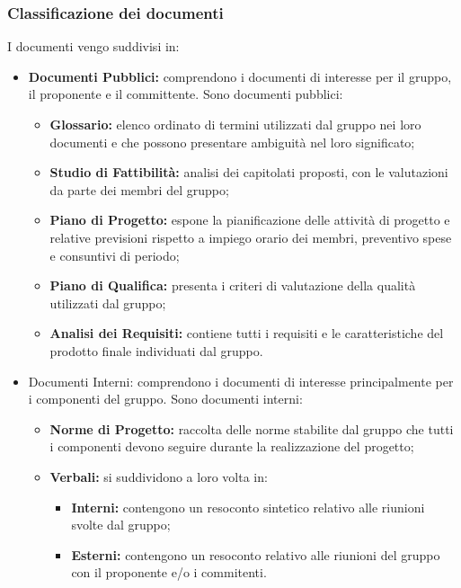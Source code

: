 \subsubsection{Classificazione dei documenti}\label{ClassificazioneDocumenti}
I documenti vengo suddivisi in:
\begin{itemize}
	\item \textbf{Documenti Pubblici: }comprendono i documenti di interesse per il gruppo, il proponente e il committente. 
	Sono documenti pubblici:
	\begin{itemize}
		\item \textbf{Glossario: }elenco ordinato di termini utilizzati dal gruppo nei loro documenti e che possono presentare ambiguità nel loro significato;
		\item \textbf{Studio di Fattibilità: }analisi dei capitolati proposti, con le valutazioni da parte dei membri del gruppo;
		\item \textbf{Piano di Progetto: }espone la pianificazione delle attività di progetto e relative previsioni rispetto a impiego orario dei membri, preventivo spese e consuntivi di periodo;
		\item \textbf{Piano di Qualifica: }presenta i criteri di valutazione della qualità utilizzati dal gruppo;
		\item \textbf{Analisi dei Requisiti: }contiene tutti i requisiti e le caratteristiche del prodotto finale individuati dal gruppo.
	\end{itemize}
	\item Documenti Interni: comprendono i documenti di interesse principalmente per i componenti del gruppo.
	Sono documenti interni:
	\begin{itemize}
		\item \textbf{Norme di Progetto:} raccolta delle norme stabilite dal gruppo che tutti i componenti devono seguire durante la realizzazione del progetto;
		\item \textbf{Verbali:} si suddividono a loro volta in:
		\begin{itemize}
			\item \textbf{Interni:} contengono un resoconto sintetico relativo alle riunioni svolte dal gruppo;
			\item \textbf{Esterni:} contengono un resoconto relativo alle riunioni del gruppo con il proponente e/o i commitenti.
		\end{itemize}
	\end{itemize}
\end{itemize}

